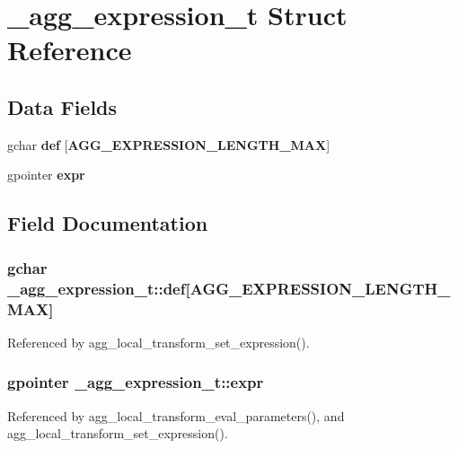 \section{\+\_\+agg\+\_\+expression\+\_\+t Struct Reference}
\label{struct__agg__expression__t}
\subsection*{Data Fields}
\begin{DoxyCompactItemize}
\item 
gchar {\bf def} [{\bf A\+G\+G\+\_\+\+E\+X\+P\+R\+E\+S\+S\+I\+O\+N\+\_\+\+L\+E\+N\+G\+T\+H\+\_\+\+M\+A\+X}]
\item 
gpointer {\bf expr}
\end{DoxyCompactItemize}


\subsection{Field Documentation}
\subsubsection[{def}]{\setlength{\rightskip}{0pt plus 5cm}gchar \+\_\+agg\+\_\+expression\+\_\+t\+::def[{\bf A\+G\+G\+\_\+\+E\+X\+P\+R\+E\+S\+S\+I\+O\+N\+\_\+\+L\+E\+N\+G\+T\+H\+\_\+\+M\+A\+X}]}\label{struct__agg__expression__t_ad2b881be0f8a44a1940e07c2d1c25c89}


Referenced by agg\+\_\+local\+\_\+transform\+\_\+set\+\_\+expression().

\subsubsection[{expr}]{\setlength{\rightskip}{0pt plus 5cm}gpointer \+\_\+agg\+\_\+expression\+\_\+t\+::expr}\label{struct__agg__expression__t_a35bd38432bb5354fa7eb6ef82c1d2dbd}


Referenced by agg\+\_\+local\+\_\+transform\+\_\+eval\+\_\+parameters(), and agg\+\_\+local\+\_\+transform\+\_\+set\+\_\+expression().

